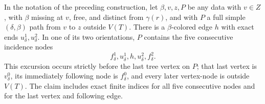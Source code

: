 \begin{helper}
In the notation of the preceding construction, let $\beta,v,z,P$ be any
data with $v\in Z$, with $\beta$ missing at $v$, free, and distinct from
$\gamma(r)$, and with $P$ a full simple $(\delta,\beta)$ path from $v$ to
$z$ outside $V(T)$.  There is a $\beta$-colored edge $h$ with exact ends
$u^1_\delta,u^2_\delta$.  In one of its two orientations, $P$ contains
the five consecutive incidence nodes
\[
 f^1_\delta,u^1_\delta,h,u^2_\delta,f^2_\delta.
\]
This excursion occurs strictly before the last tree vertex on $P$; that
last vertex is $v^0_\delta$, its immediately following node is
$f^0_\delta$, and every later vertex-node is outside $V(T)$.  The claim
includes exact finite indices for all five consecutive nodes and for the
last vertex and following edge.
\end{helper}
